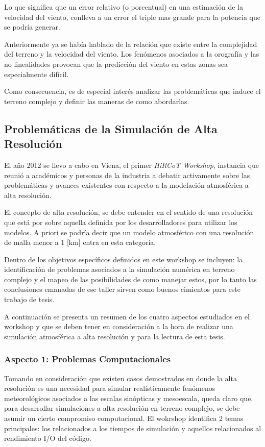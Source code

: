Lo que significa que un error relativo (o porcentual) en una estimación de la velocidad del viento, conlleva a un error el triple mas grande para la potencia que se podría generar.

Anteriormente ya se había hablado de la relación que existe entre la complejidad del terreno y la velocidad del viento. Los fenómenos asociados a la orografía y las no linealidades provocan que la predicción del viento en estas zonas sea especialmente difícil. 

Como consecuencia, es de especial interés analizar las problemáticas que induce el terreno complejo y definir las maneras de como abordarlas.
\subsection{Problemáticas de la Simulación de Alta Resolución}
El año 2012 se llevo a cabo en Viena, el primer \emph{HiRCoT Workshop}, instancia que reunió a académicos y personas de la industria a debatir activamente sobre las problemáticas y avances existentes con respecto a la modelación atmosférica a alta resolución.

El concepto de alta resolución, se debe entender en el sentido de una resolución que está por sobre aquella definida por los desarrolladores para utilizar los modelos. A priori se podría decir que un modelo atmosférico con una resolución de malla menor a 1 [km] entra en esta categoría.

Dentro de los objetivos específicos definidos en este workshop se incluyen: la identificación de problemas asociados a la simulación numérica en terreno complejo y el mapeo de las posibilidades de como manejar estos, por lo tanto las conclusiones emanadas de ese taller sirven como buenos cimientos para este trabajo de tesis.

A continuación se presenta un resumen de los cuatro aspectos estudiados en el workshop y que se deben tener en consideración a la hora de realizar una simulación atmosférica a alta resolución y para la lectura de esta tesis.

\subsubsection{Aspecto 1: Problemas Computacionales}
Tomando en consideración que existen casos demostrados en donde la alta resolución es una necesidad para simular realísticamente fenómenos meteorológicos asociados a las escalas sinópticas y mesoescala, queda claro que, para desarrollar simulaciones a alta resolución en terreno complejo, se debe asumir un cierto compromiso computacional. El wokrshop identifica 2 temas principales: los relacionados a los tiempos de simulación y aquellos relacionados al rendimiento I/O del código.

